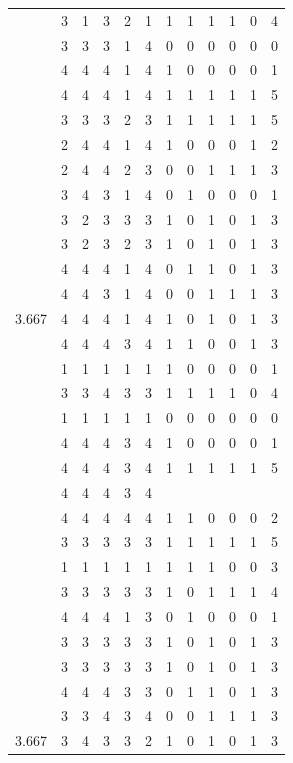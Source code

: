 \documentclass[]{msu-thesis}
\theoremstyle{definition}
\theoremstyle{definition}
\theoremstyle{definition}
\theoremstyle{remark}
\begin{document}
\begin{table}
{\begin{tabular}[t]{rrrrrrrrrrrr}
 & 3 & 1 & 3 & 2 & 1 & 1 & 1 & 1 & 1 & 0 & 4\\
 & 3 & 3 & 3 & 1 & 4 & 0 & 0 & 0 & 0 & 0 & 0\\
 & 4 & 4 & 4 & 1 & 4 & 1 & 0 & 0 & 0 & 0 & 1\\
 & 4 & 4 & 4 & 1 & 4 & 1 & 1 & 1 & 1 & 1 & 5\\
 & 3 & 3 & 3 & 2 & 3 & 1 & 1 & 1 & 1 & 1 & 5\\
 & 2 & 4 & 4 & 1 & 4 & 1 & 0 & 0 & 0 & 1 & 2\\
 & 2 & 4 & 4 & 2 & 3 & 0 & 0 & 1 & 1 & 1 & 3\\
 & 3 & 4 & 3 & 1 & 4 & 0 & 1 & 0 & 0 & 0 & 1\\
 & 3 & 2 & 3 & 3 & 3 & 1 & 0 & 1 & 0 & 1 & 3\\
 & 3 & 2 & 3 & 2 & 3 & 1 & 0 & 1 & 0 & 1 & 3\\
 & 4 & 4 & 4 & 1 & 4 & 0 & 1 & 1 & 0 & 1 & 3\\
 & 4 & 4 & 3 & 1 & 4 & 0 & 0 & 1 & 1 & 1 & 3\\
3.667 & 4 & 4 & 4 & 1 & 4 & 1 & 0 & 1 & 0 & 1 & 3\\
 & 4 & 4 & 4 & 3 & 4 & 1 & 1 & 0 & 0 & 1 & 3\\
 & 1 & 1 & 1 & 1 & 1 & 1 & 0 & 0 & 0 & 0 & 1\\
 & 3 & 3 & 4 & 3 & 3 & 1 & 1 & 1 & 1 & 0 & 4\\
 & 1 & 1 & 1 & 1 & 1 & 0 & 0 & 0 & 0 & 0 & 0\\
 & 4 & 4 & 4 & 3 & 4 & 1 & 0 & 0 & 0 & 0 & 1\\
 & 4 & 4 & 4 & 3 & 4 & 1 & 1 & 1 & 1 & 1 & 5\\
 & 4 & 4 & 4 & 3 & 4 &  &  &  &  &  & \\
 & 4 & 4 & 4 & 4 & 4 & 1 & 1 & 0 & 0 & 0 & 2\\
 & 3 & 3 & 3 & 3 & 3 & 1 & 1 & 1 & 1 & 1 & 5\\
 & 1 & 1 & 1 & 1 & 1 & 1 & 1 & 1 & 0 & 0 & 3\\
 & 3 & 3 & 3 & 3 & 3 & 1 & 0 & 1 & 1 & 1 & 4\\
 & 4 & 4 & 4 & 1 & 3 & 0 & 1 & 0 & 0 & 0 & 1\\
 & 3 & 3 & 3 & 3 & 3 & 1 & 0 & 1 & 0 & 1 & 3\\
 & 3 & 3 & 3 & 3 & 3 & 1 & 0 & 1 & 0 & 1 & 3\\
 & 4 & 4 & 4 & 3 & 3 & 0 & 1 & 1 & 0 & 1 & 3\\
 & 3 & 3 & 4 & 3 & 4 & 0 & 0 & 1 & 1 & 1 & 3\\
3.667 & 3 & 4 & 3 & 3 & 2 & 1 & 0 & 1 & 0 & 1 & 3\\

\end{tabular}}
\end{table}
\end{document}
